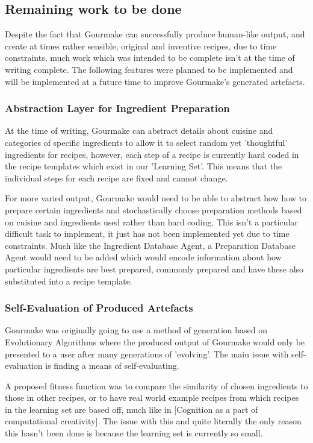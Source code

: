 \documentclass[9pt,titlepage,a4paper]{extarticle}
\begin{document}
\subsection{Remaining work to be done}
    Despite the fact that Gourmake can successfully produce human-like output, and create at times rather sensible,
    original and inventive recipes, due to time constraints, much work which was intended to be complete isn't at
    the time of writing complete. The following features were planned to be implemented and will be implemented
    at a future time to improve Gourmake's generated artefacts.

\subsubsection{Abstraction Layer for Ingredient Preparation}
    At the time of writing, Gourmake can abstract details about cuisine and categories of specific ingredients to allow
    it to select random yet 'thoughtful' ingredients for recipes, however, each step of a recipe is currently hard
    coded in the recipe templates which exist in our 'Learning Set'. This means that the individual steps for each
    recipe are fixed and cannot change.

    For more varied output, Gourmake would need to be able to abstract how how to prepare certain ingredients and
    stochastically choose preparation methods based on cuisine and ingredients used rather than hard coding. This isn't
    a particular difficult task to implement, it just has not been implemented yet due to time constraints. Much like
    the Ingredient Database Agent, a Preparation Database Agent would need to be added which would encode information
    about how particular ingredients are best prepared, commonly prepared and have these also substituted into
    a recipe template.

\subsubsection{Self-Evaluation of Produced Artefacts}
    Gourmake was originally going to use a method of generation based on Evolutionary Algorithms where the produced output
    of Gourmake would only be presented to a user after many generations of 'evolving'. The main issue with self-evaluation
    is finding a means of self-evaluating.

    A proposed fitness function was to compare the similarity of chosen ingredients to those in other recipes, or to have
    real world example recipes from which recipes in the learning set are based off, much like in [Cognition as a part of
    computational creativity]. The issue with this and quite literally the only reason this hasn't been done is because 
    the learning set is currently so small.
\end{document}
